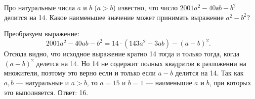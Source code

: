 

\begin{itemize}

\itC Про натуральные числа $a$ и $b$ ($a>b$) известно, что число $2001a^2-40аb-b^2$ делится на 14. Какое наименьшее значение может принимать выражение $a^2-b^2$?

\itr Преобразуем выражение:
$$
2001a^2-40ab-b^2=14\cdot(143a^2-3ab)-(a-b)^2.
$$
Отсюда видно, что  исходное выражение кратно 14 тогда и только тогда, когда $(a-b)^2$ делется на 14. Но 14 не содержит полных квадратов в разложении на множители, поэтому это верно если и только если $a-b$ делится на 14. Так как $a,b$ --- натуральные и $a>b$, то $a=15$ и $b=1$ --- наименьшие $a$ и $b$, при которых это выполняется. 
Ответ: 16.

\end{itemize}
